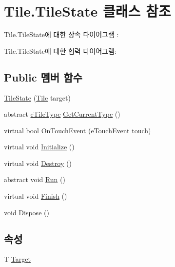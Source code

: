 \hypertarget{class_tile_1_1_tile_state}{}\section{Tile.\+Tile\+State 클래스 참조}
\label{class_tile_1_1_tile_state}


Tile.\+Tile\+State에 대한 상속 다이어그램 \+: 


Tile.\+Tile\+State에 대한 협력 다이어그램\+:
\subsection*{Public 멤버 함수}
\begin{DoxyCompactItemize}
\item 
\hyperlink{class_tile_1_1_tile_state_a3cb3d3d596f38e7fc846a115a74843b9}{Tile\+State} (\hyperlink{class_tile}{Tile} target)
\item 
abstract \hyperlink{_tile_8cs_a271bc07be325bca511bcb747e0ff2fda}{e\+Tile\+Type} \hyperlink{class_tile_1_1_tile_state_a9649a2b7b7cb3ae49eb35df6b6eef43e}{Get\+Current\+Type} ()
\item 
virtual bool \hyperlink{class_tile_1_1_tile_state_a8687f7cb0e2c1a436c5ac395f4f6d07a}{On\+Touch\+Event} (\hyperlink{_touch_manager_8cs_ae33e321a424fe84ba8b2fdb81ad40a68}{e\+Touch\+Event} touch)
\item 
virtual void \hyperlink{class_f_z_1_1_state_a27ac6fd2e844476017b35aa781d73c8c}{Initialize} ()
\item 
virtual void \hyperlink{class_f_z_1_1_state_aa85fdf4a5495d6d5d3ed4aeda3497c8a}{Destroy} ()
\item 
abstract void \hyperlink{class_f_z_1_1_state_acaf1584680a2e69e2a4da20574723981}{Run} ()
\item 
virtual void \hyperlink{class_f_z_1_1_state_a288bb8c3fceee4bf03f01e295dcef1be}{Finish} ()
\item 
void \hyperlink{class_f_z_1_1_state_a598887d3fbb412fada132dc1c079b25b}{Dispose} ()
\end{DoxyCompactItemize}
\subsection*{속성}
\begin{DoxyCompactItemize}
\item 
T \hyperlink{class_f_z_1_1_state_a6927f5c9f2517052f9dc5596188e9d95}{Target}
\end{DoxyCompactItemize}


